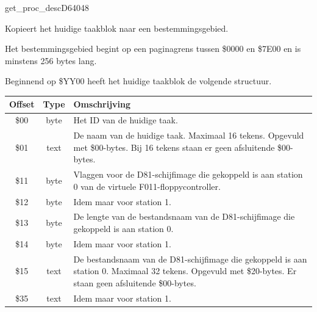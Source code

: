 \newpage
\begin{hyppotrap}{get\_proc\_desc}{D640}{48}

\item [Dienst:]  Kopieert het huidige taakblok naar een bestemmingsgebied.
\item [Voorwaarden:]  Het bestemmingsgebied begint op een paginagrens tussen \$0000 en \$7E00 en is minstens 256 bytes lang.
\item [Invoer:]  
\item [Uitvoer:]
  \raggedright Beginnend op \$YY00 heeft het huidige taakblok de volgende structuur.  {\setlength{\tabcolsep}{2mm}
  \begin{tabular}{|c|c|p{6.9cm}|}
  \hline

  \textbf{Offset} & \textbf{Type} & \textbf{Omschrijving}
  \\\hline

  \$00 & byte & Het ID van de huidige taak.
  \\

  \$01 & text & De naam van de huidige taak. Maximaal 16 tekens.                Opgevuld met \$00-bytes.                Bij 16 tekens staan er geen afsluitende \$00-bytes.
  \\

  \$11 & byte & Vlaggen voor de D81-schijfimage die gekoppeld is aan station 0 van de                virtuele F011-floppycontroller.
  \\

  \$12 & byte & Idem maar voor station 1.
  \\

  \$13 & byte & De lengte van de bestandsnaam van de D81-schijfimage die gekoppeld is aan station 0.
  \\

  \$14 & byte & Idem maar voor station 1.
  \\

  \$15 & text & De bestandsnaam van de D81-schijfimage die gekoppeld is aan station 0.                Maximaal 32 tekens. Opgevuld met \$20-bytes.                Er staan geen afsluitende \$00-bytes.
  \\

  \$35 & text & Idem maar voor station 1.
  \\


\end{tabular}}
\end{hyppotrap}
